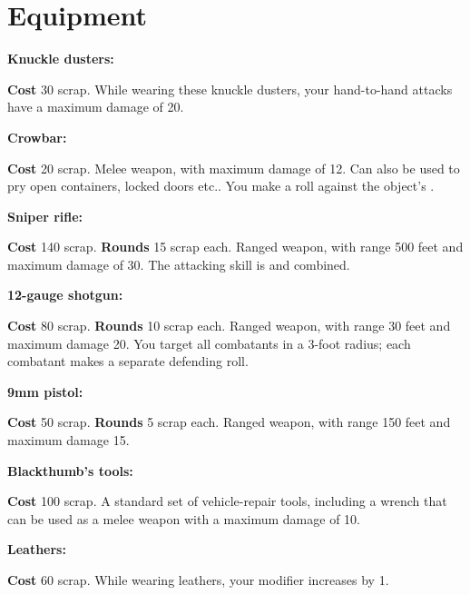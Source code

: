 \documentclass[10pt, a4paper, twocolumn]{article}
\begin{document}
\vspace*{-1em}
\section{Equipment}
\newcommand{\prop}[2]{\textbf{#1} #2.}
\newenvironment{describe}[1]{
  \textbf{\large #1:}
}{}

\begin{describe}{Knuckle dusters}
  \prop{Cost}{30 scrap}
  While wearing these knuckle dusters, your hand-to-hand attacks have a maximum damage of 20.
\end{describe}

\begin{describe}{Crowbar}
  \prop{Cost}{20 scrap}
  Melee weapon, with maximum damage of 12. Can also be used to pry open containers, locked doors etc.. You make a  roll against the object's .
\end{describe}

\begin{describe}{Sniper rifle}
  \prop{Cost}{140 scrap}
  \prop{Rounds}{15 scrap each}
  Ranged weapon, with range 500 feet and maximum damage of 30. The attacking skill is  and  combined.
\end{describe}

\begin{describe}{12-gauge shotgun}
  \prop{Cost}{80 scrap}
  \prop{Rounds}{10 scrap each}
  Ranged weapon, with range 30 feet and maximum damage 20. You target all combatants in a 3-foot radius; each combatant makes a separate defending roll.
\end{describe}

\begin{describe}{9mm pistol}
  \prop{Cost}{50 scrap}
  \prop{Rounds}{5 scrap each}
  Ranged weapon, with range 150 feet and maximum damage 15.
\end{describe}

\begin{describe}{Blackthumb's tools}
  \prop{Cost}{100 scrap}
  A standard set of vehicle-repair tools, including a wrench that can be used as a melee weapon with a maximum damage of 10.
\end{describe}

\begin{describe}{Leathers}
  \prop{Cost}{60 scrap}
  While wearing leathers, your  modifier increases by 1.
\end{describe}
\end{document}
